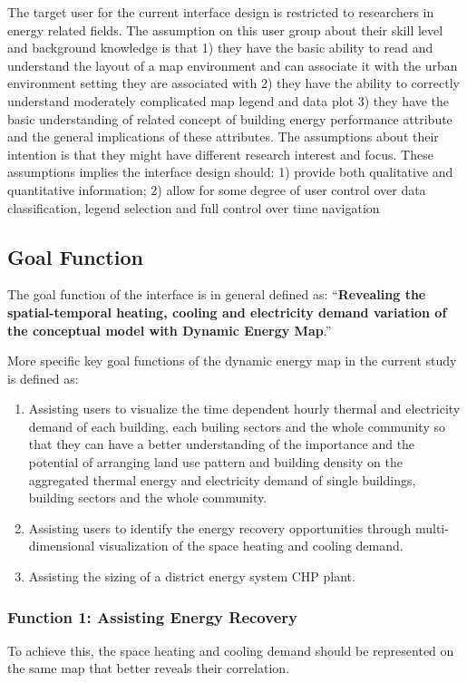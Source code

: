 The target user for the current interface design is restricted to
researchers in energy related fields. The assumption on this user
group about their skill level and background knowledge is that 1) they
have the basic ability to read and understand the layout of a map
environment and can associate it with the urban environment setting
they are associated with 2) they have the ability to correctly
understand moderately complicated map legend and data plot 3) they
have the basic understanding of related concept of building energy
performance attribute and the general implications of these
attributes. The assumptions about their intention is that they might
have different research interest and focus. These assumptions implies
the interface design should: 1) provide both qualitative and
quantitative information; 2) allow for some degree of user control
over data classification, legend selection and full control over time
navigation

\subsection{Goal Function}
The goal function of the interface is in general defined as:
``\textbf{Revealing the spatial-temporal heating, cooling and
  electricity demand variation of the conceptual model with Dynamic
  Energy Map}.''

More specific key goal functions of the dynamic energy map in the
current study is defined as:
\begin{enumerate}[1)]
\item Assisting users to visualize the time dependent hourly thermal
  and electricity demand of each building, each builing sectors and
  the whole community so that they can have a better understanding of
  the importance and the potential of arranging land use pattern and
  building density on the aggregated thermal energy and electricity
  demand of single buildings, building sectors and the whole community.
\item Assisting users to identify the energy recovery opportunities
  through multi-dimensional visualization of the space heating and
  cooling demand.
\item Assisting the sizing of a district energy system CHP plant.
\end{enumerate}

\subsubsection{Function 1: Assisting Energy Recovery}
To achieve this, the space heating and cooling demand should be
represented on the same map that better reveals their correlation.

